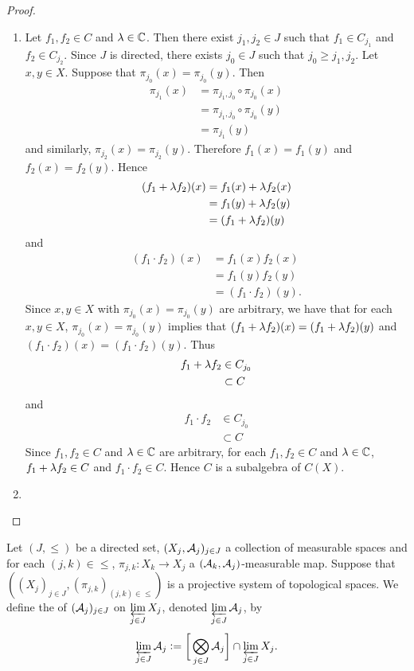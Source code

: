 \documentclass{book}
\begin{document}
\begin{proof}\
	 \begin{enumerate}
	 	\item Let $f_1 , f_2 \in C$ and $\lambda \in \mathbb{C}$. Then there exist $j_1, j_2 \in J$ such that $f_1 \in C_{j_1}$ and $f_2 \in C_{j_2}$. Since $J$ is directed, there exists $j_0 \in J$ such that $j_0 \geq j_1, j_2$. Let $x,y \in X$. Suppose that $\pi_{j_0}(x) = \pi_{j_0}(y)$. Then 
	 	\begin{align*}
	 		\pi_{j_1}(x)
	 		& = \pi_{j_1, j_0} \circ \pi_{j_0}(x) \\
	 		& =  \pi_{j_1, j_0} \circ \pi_{j_0}(y) \\
	 		& = \pi_{j_1}(y)
	 	\end{align*}
	 	and similarly, $\pi_{j_2}(x) = \pi_{j_2}(y)$. Therefore $f_1(x) = f_1(y)$ and $f_{2}(x) = f_2(y)$. Hence 
	 	\begin{align*}
	 		(f_1 + \lambda f_2)(x)
	 		& = f_1(x) + \lambda f_2(x) \\
	 		& = f_1(y) + \lambda f_2(y) \\
	 		& = (f_1 + \lambda f_2)(y)
	 	\end{align*}
	 	and 
	 	\begin{align*}
	 		(f_1 \cdot f_2)(x)
	 		& = f_1(x)f_2(x) \\
	 		& = f_1(y)f_2(y) \\
	 		& = (f_1 \cdot f_2) (y).
	 	\end{align*}
	 	Since $x, y \in X$ with $\pi_{j_0}(x) = \pi_{j_0}(y)$ are arbitrary, we have that for each $x,y \in X$, $\pi_{j_0}(x) = \pi_{j_0}(y)$ implies that $(f_1 + \lambda f_2)(x) = (f_1 + \lambda f_2)(y)$ and $(f_1 \cdot f_2)(x) = (f_1 \cdot f_2)(y)$. Thus 
	 	\begin{align*}
	 		f_1 + \lambda f_2 
	 		& \in C_{j_0} \\
	 		& \subset C
	 	\end{align*} 
	 	and 
	 	\begin{align*}
	 		f_1 \cdot f_2
	 		& \in C_{j_0} \\
	 		& \subset C
	 	\end{align*} 
	 	Since $f_1 , f_2 \in C$ and $\lambda \in \mathbb{C}$ are arbitrary, for each $f_1 , f_2 \in C$ and $\lambda \in \mathbb{C}$, $f_1 + \lambda f_2 \in C$ and $f_1 \cdot f_2 \in C$. Hence $C$ is a subalgebra of $C(X)$. 
	 	\item 
	 \end{enumerate}
\end{proof}


\begin{defn} 
	Let $(J, {\leq})$ be a directed set, $(X_j, \mathcal{A}_j)_{j \in J}$ a collection of measurable spaces and for each $(j,k) \in {\leq}$, $\pi_{j,k}:X_k \rightarrow X_j$ a $(\mathcal{A}_k, \mathcal{A}_j)$-measurable map. Suppose that $((X_j)_{j \in J}, (\pi_{j,k})_{(j,k) \in {\leq}})$ is a projective system of topological spaces. We define the  of $(\mathcal{A}_j)_{j \in J}$ on $\varprojlim\limits_{j \in J} X_j$, denoted $\varprojlim\limits_{j \in J} \mathcal{A}_j$, by $$\varprojlim\limits_{j \in J} \mathcal{A}_j \vcentcolon= \bigg[ \bigotimes\limits_{j \in J} \mathcal{A}_j \bigg] \cap \varprojlim\limits_{j \in J} X_j.$$
\end{defn}
\end{document}
